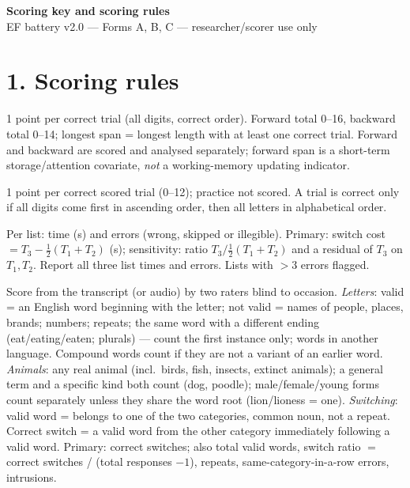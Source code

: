 \documentclass[10pt,a4paper]{article}
\begin{document}
\begin{center}{\LARGE\bfseries Scoring key and scoring rules}\\[3pt]{\small EF battery v2.0 --- Forms A, B, C --- researcher/scorer use only}\end{center}
\section*{1. Scoring rules}
\begin{description}[style=nextline,leftmargin=0.6cm,itemsep=3pt]
\item[W1 Number repetition] 1 point per correct trial (all digits, correct order). Forward total 0--16, backward total 0--14; longest span = longest length with at least one correct trial. Forward and backward are scored and analysed separately; forward span is a short-term storage/attention covariate, \emph{not} a working-memory updating indicator.
\item[W2 Sorting numbers and letters] 1 point per correct scored trial (0--12); practice not scored. A trial is correct only if all digits come first in ascending order, then all letters in alphabetical order.
\item[W3 Adding and subtracting] Per list: time (s) and errors (wrong, skipped or illegible). Primary: switch cost $= T_3 - \tfrac12(T_1+T_2)$ (s); sensitivity: ratio $T_3/\tfrac12(T_1+T_2)$ and a residual of $T_3$ on $T_1,T_2$. Report all three list times and errors. Lists with $>3$ errors flagged.
\item[W4 Word lists] Score from the transcript (or audio) by two raters blind to occasion. \emph{Letters}: valid = an English word beginning with the letter; not valid = names of people, places, brands; numbers; repeats; the same word with a different ending (eat/eating/eaten; plurals) --- count the first instance only; words in another language. Compound words count if they are not a variant of an earlier word. \emph{Animals}: any real animal (incl.\ birds, fish, insects, extinct animals); a general term and a specific kind both count (dog, poodle); male/female/young forms count separately unless they share the word root (lion/lioness = one). \emph{Switching}: valid word = belongs to one of the two categories, common noun, not a repeat. Correct switch = a valid word from the other category immediately following a valid word. Primary: correct switches; also total valid words, switch ratio $=$ correct switches / (total responses $-1$), repeats, same-category-in-a-row errors, intrusions.

\end{description}
\end{document}

